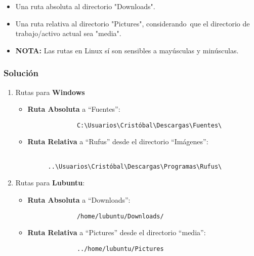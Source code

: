 \begin{itemize}
    \item Una ruta absoluta al directorio "Downloads".
    \item Una ruta relativa al directorio "Pictures", considerando que el directorio de trabajo/activo actual sea "media".
    \item \textbf{NOTA:} Las rutas en Linux sí son sensibles a mayúsculas y minúsculas.
\end{itemize}

\subsubsection{Solución}

\begin{enumerate}[label=(\alph*).]
    \item Rutas para \textbf{Windows}
    \begin{itemize}
        \item \textbf{Ruta Absoluta} a ``Fuentes'':
        \begin{figure}[h]
                \begin{verbatim}
        C:\Usuarios\Cristóbal\Descargas\Fuentes\
                \end{verbatim}
        \end{figure}

         \item \textbf{Ruta Relativa} a ``Rufus'' desde el directorio ``Imágenes'':
            \begin{figure}[h]
                \begin{verbatim}
        ..\Usuarios\Cristóbal\Descargas\Programas\Rufus\
                \end{verbatim}
            \end{figure}
    \end{itemize}

    \item Rutas para \textbf{Lubuntu}:
    \begin{itemize}
        \item \textbf{Ruta Absoluta} a ``Downloads'':
        \begin{figure}[h]
            \begin{verbatim}
        /home/lubuntu/Downloads/
            \end{verbatim}
        \end{figure}

        \item \textbf{Ruta Relativa} a ``Pictures'' desde el directorio ``media'':
        \begin{figure}[H]
            \begin{verbatim}
        ../home/lubuntu/Pictures
            \end{verbatim}
        \end{figure}
    \end{itemize}
\end{enumerate}

\newpage



